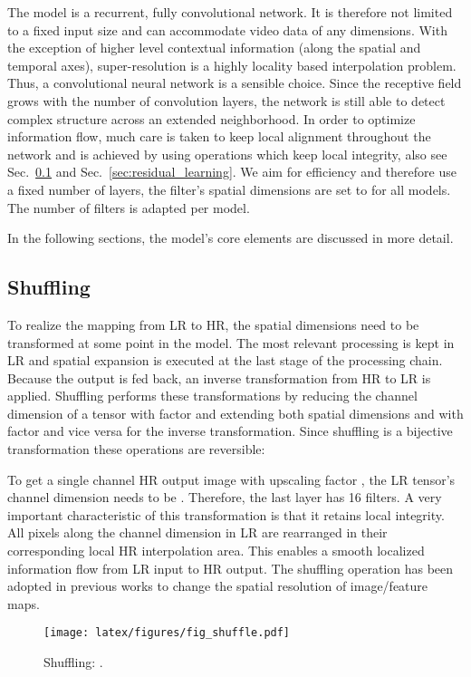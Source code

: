 \documentclass[10pt,twocolumn,letterpaper]{article}
\begin{document}
The model is a recurrent, fully convolutional network. It is therefore not limited to a fixed input size and can accommodate video data of any dimensions. With the exception of higher level contextual information (along the spatial and temporal axes), super-resolution is a highly locality based interpolation problem. Thus, a convolutional neural network is a sensible choice. Since the receptive field grows with the number of convolution layers, the network is still able to detect complex structure across an extended neighborhood. In order to optimize information flow, much care is taken to keep local alignment throughout the network and is achieved by using operations which keep local integrity, also see Sec.~\ref{sec:shuffling} and Sec.~\ref{sec:residual_learning}. 
We aim for efficiency and therefore use a fixed number of  layers, the filter's spatial dimensions are set to  for all models. The number of filters  is adapted per model.

In the following sections, the model's core elements are discussed in more detail.

\subsection{Shuffling}
\label{sec:shuffling}

To realize the mapping from LR to HR, the spatial dimensions need to be transformed at some point in the model. The most relevant processing is kept in LR and spatial expansion is executed at the last stage of the processing chain. Because the output is fed back, an inverse transformation from HR to LR is applied. Shuffling performs these transformations by reducing the channel dimension  of a tensor  with factor  and extending both spatial dimensions  and  with factor  and vice versa for the inverse transformation. Since shuffling is a bijective transformation these operations are reversible:


To get a single channel HR output image with upscaling factor , the LR tensor's channel dimension needs to be . Therefore, the last layer has 16 filters. A very important characteristic of this transformation is that it retains local integrity. All pixels along the channel dimension in LR are rearranged in their corresponding local HR interpolation area. This enables a smooth localized information flow from LR input to HR output.
The shuffling operation has been adopted in previous works \cite{ESPCN, frvsr} to change the spatial resolution of image/feature maps. 
\begin{figure}
\begin{center}
\texttt{[image: latex/figures/fig\_shuffle.pdf]}
\end{center}
   \caption{Shuffling: .}
\label{fig:latentspace}
\vspace{-0.14cm}
\end{figure}
\end{document}
